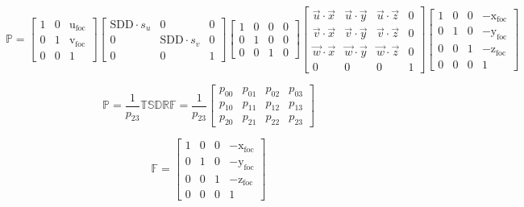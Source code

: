 \documentclass[10pt, a4paper, fleqn]{scrartcl}
\begin{document}
\begin{equation*}
\mathds{P}=
\begin{bmatrix}
1 & 0 & \text{u}_\text{foc} \\
0 & 1 & \text{v}_\text{foc} \\
0 & 0 & 1
\end{bmatrix}
\begin{bmatrix}
\text{SDD}\cdot s_u & 0 & 0 \\
0 & \text{SDD}\cdot s_v & 0 \\
0 & 0 & 1
\end{bmatrix}
\begin{bmatrix}
1 & 0 & 0 & 0 \\
0 & 1 & 0 & 0 \\
0 & 0 & 1 & 0
\end{bmatrix}
\begin{bmatrix}
\vec{u} \cdot \vec{x} & \vec{u} \cdot \vec{y} & \vec{u} \cdot \vec{z} & 0\\
\vec{v} \cdot \vec{x} & \vec{v} \cdot \vec{y} & \vec{v} \cdot \vec{z} & 0\\
\vec{w} \cdot \vec{x} & \vec{w} \cdot \vec{y} & \vec{w} \cdot \vec{z} & 0\\
0 & 0 & 0 & 1
\end{bmatrix}
\begin{bmatrix}
1 & 0 & 0 & -\text{x}_\text{foc} \\
0 & 1 & 0 & -\text{y}_\text{foc} \\
0 & 0 & 1 & -\text{z}_\text{foc} \\
0 & 0 & 0 & 1
\end{bmatrix}
\end{equation*}

\begin{equation*}
\mathds{P}=\frac{1}{p_{23}}\mathds{T}\mathds{S}\mathds{D}\mathds{R}\mathds{F} = \frac{1}{p_{23}} \begin{bmatrix}
p_{00} & p_{01} & p_{02} & p_{03} \\
p_{10} & p_{11} & p_{12} & p_{13} \\
p_{20} & p_{21} & p_{22} & p_{23}
\end{bmatrix}
\end{equation*}


\begin{equation*}
\mathds{F}=\begin{bmatrix}
1 & 0 & 0 & -\text{x}_\text{foc} \\
0 & 1 & 0 & -\text{y}_\text{foc} \\
0 & 0 & 1 & -\text{z}_\text{foc} \\
0 & 0 & 0 & 1
\end{bmatrix}
\end{equation*}
\end{document}
